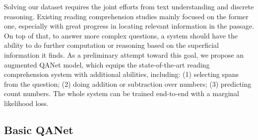 Solving our dataset requires the joint efforts from text understanding and discrete reasoning. Existing reading comprehension studies mainly focused on the former one, especially with great progress in locating relevant information in the passage. On top of that, to answer more complex questions, a system should have the ability to do further computation or reasoning based on the superficial information it finds. As a preliminary attempt toward this goal, we propose an augmented QANet model, which equips the state-of-the-art reading comprehension system with additional abilities, including: (1) selecting spans from the question; (2) doing addition or subtraction over numbers; (3) predicting count numbers. The whole system can be trained end-to-end with a marginal likelihood loss.

\subsection{Basic QANet}

\subsection{}